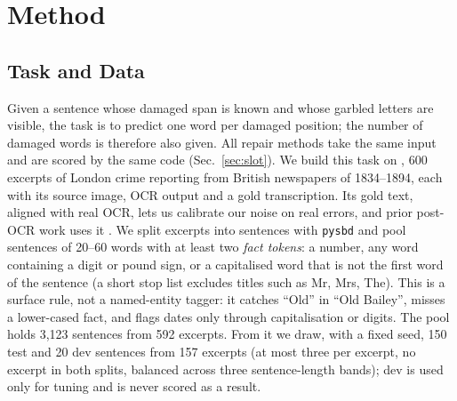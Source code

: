 \section{Method}
\label{sec:method}
%

\subsection{Task and Data}
Given a sentence whose damaged span is known and whose garbled letters are visible, the task is to predict one word
per damaged position; the number of damaged words is therefore also given. All repair methods take the same input
and are scored by the same code (Sec.~\ref{sec:slot}). We build this task on \bln{} \citep{booth-etal-2024-bln600},
600 excerpts of London crime reporting from British newspapers of 1834--1894, each with its source image, OCR output
and a gold transcription. Its gold text, aligned with real OCR, lets us calibrate
our noise on real errors, and prior post-OCR work uses it \citep{thomas2024leveraging}. We split excerpts into sentences with \texttt{pysbd} and pool sentences of 20--60 words
with at least two \emph{fact tokens}: a number, any word containing a digit or pound sign, or a capitalised word that
is not the first word of the sentence (a short stop list excludes titles such as Mr, Mrs, The). This is a surface
rule, not a named-entity tagger: it catches ``Old'' in ``Old Bailey'', misses a lower-cased fact, and flags dates
only through capitalisation or digits.
 The pool holds 3,123 sentences from 592 excerpts. From it we draw, with a fixed
seed, 150 test and 20 dev sentences from 157 excerpts (at most three per excerpt, no excerpt in both splits,
balanced across three sentence-length bands); dev is used only for tuning and is never scored as a result.

